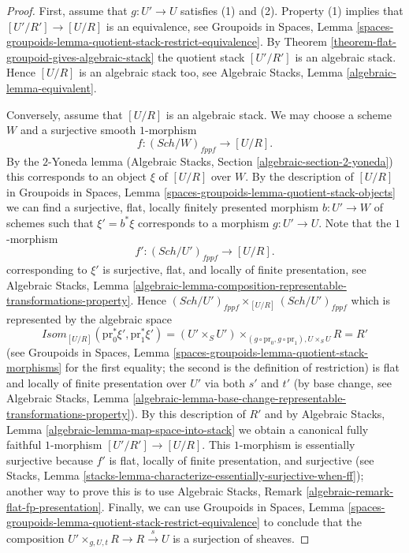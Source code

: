 \documentclass{stacks-project}
\theoremstyle{plain}
\theoremstyle{definition}
\theoremstyle{remark}
\numberwithin{equation}{subsection}
\def\Sch{\mathit{Sch}}
\begin{document}
\begin{proof}
First, assume that $g : U' \to U$ satisfies (1) and (2). Property (1)
implies that $[U'/R'] \to [U/R]$ is an equivalence, see
Groupoids in Spaces,
Lemma \ref{spaces-groupoids-lemma-quotient-stack-restrict-equivalence}.
By
Theorem \ref{theorem-flat-groupoid-gives-algebraic-stack}
the quotient stack $[U'/R']$ is an algebraic stack. Hence
$[U/R]$ is an algebraic stack too, see
Algebraic Stacks, Lemma \ref{algebraic-lemma-equivalent}.

\medskip\noindent
Conversely, assume that $[U/R]$ is an algebraic stack. We may choose a
scheme $W$ and a surjective smooth $1$-morphism
$$
f : (\Sch/W)_{fppf} \longrightarrow [U/R].
$$
By the $2$-Yoneda lemma
(Algebraic Stacks, Section \ref{algebraic-section-2-yoneda})
this corresponds to an object $\xi$ of $[U/R]$ over $W$.
By the description of $[U/R]$ in
Groupoids in Spaces, Lemma \ref{spaces-groupoids-lemma-quotient-stack-objects}
we can find a surjective, flat, locally finitely presented morphism
$b : U' \to W$ of schemes such that $\xi' = b^*\xi$ corresponds to a morphism
$g : U' \to U$. Note that the $1$-morphism
$$
f' : (\Sch/U')_{fppf} \longrightarrow [U/R].
$$
corresponding to $\xi'$ is surjective, flat, and locally of finite
presentation, see
Algebraic Stacks, Lemma
\ref{algebraic-lemma-composition-representable-transformations-property}.
Hence
$(\Sch/U')_{fppf} \times_{[U/R]} (\Sch/U')_{fppf}$
which is represented by the algebraic space
$$
\mathit{Isom}_{[U/R]}(\text{pr}_0^*\xi', \text{pr}_1^*\xi') =
(U' \times_S U')
\times_{(g \circ \text{pr}_0, g \circ \text{pr}_1), U \times_S U} R = R'
$$
(see
Groupoids in Spaces, Lemma
\ref{spaces-groupoids-lemma-quotient-stack-morphisms}
for the first equality; the second is the definition of restriction)
is flat and locally of finite presentation over $U'$ via both $s'$ and $t'$
(by base change, see
Algebraic Stacks, Lemma
\ref{algebraic-lemma-base-change-representable-transformations-property}).
By this description of $R'$ and by
Algebraic Stacks, Lemma \ref{algebraic-lemma-map-space-into-stack}
we obtain a canonical fully faithful $1$-morphism $[U'/R'] \to [U/R]$.
This $1$-morphism is essentially surjective because $f'$ is flat,
locally of finite presentation, and surjective (see
Stacks, Lemma \ref{stacks-lemma-characterize-essentially-surjective-when-ff});
another way to prove this is to use
Algebraic Stacks, Remark
\ref{algebraic-remark-flat-fp-presentation}.
Finally, we can use
Groupoids in Spaces, Lemma
\ref{spaces-groupoids-lemma-quotient-stack-restrict-equivalence}
to conclude that the composition
$U' \times_{g, U, t} R \to R \xrightarrow{s} U$ is a surjection of sheaves.
\end{proof}
\end{document}
